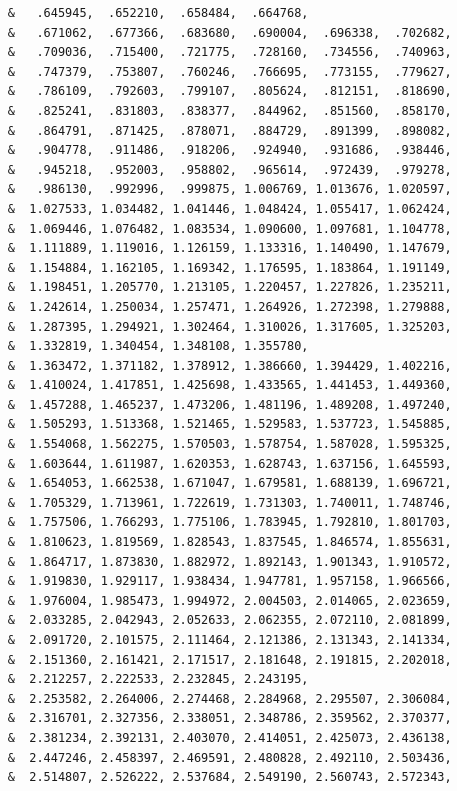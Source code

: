 \begin{lstlisting}
     &   .645945,  .652210,  .658484,  .664768,
     &   .671062,  .677366,  .683680,  .690004,  .696338,  .702682,
     &   .709036,  .715400,  .721775,  .728160,  .734556,  .740963,
     &   .747379,  .753807,  .760246,  .766695,  .773155,  .779627,
     &   .786109,  .792603,  .799107,  .805624,  .812151,  .818690,
     &   .825241,  .831803,  .838377,  .844962,  .851560,  .858170,
     &   .864791,  .871425,  .878071,  .884729,  .891399,  .898082,
     &   .904778,  .911486,  .918206,  .924940,  .931686,  .938446,
     &   .945218,  .952003,  .958802,  .965614,  .972439,  .979278,
     &   .986130,  .992996,  .999875, 1.006769, 1.013676, 1.020597,
     &  1.027533, 1.034482, 1.041446, 1.048424, 1.055417, 1.062424,
     &  1.069446, 1.076482, 1.083534, 1.090600, 1.097681, 1.104778,
     &  1.111889, 1.119016, 1.126159, 1.133316, 1.140490, 1.147679,
     &  1.154884, 1.162105, 1.169342, 1.176595, 1.183864, 1.191149,
     &  1.198451, 1.205770, 1.213105, 1.220457, 1.227826, 1.235211,
     &  1.242614, 1.250034, 1.257471, 1.264926, 1.272398, 1.279888,
     &  1.287395, 1.294921, 1.302464, 1.310026, 1.317605, 1.325203,
     &  1.332819, 1.340454, 1.348108, 1.355780,
     &  1.363472, 1.371182, 1.378912, 1.386660, 1.394429, 1.402216,
     &  1.410024, 1.417851, 1.425698, 1.433565, 1.441453, 1.449360,
     &  1.457288, 1.465237, 1.473206, 1.481196, 1.489208, 1.497240,
     &  1.505293, 1.513368, 1.521465, 1.529583, 1.537723, 1.545885,
     &  1.554068, 1.562275, 1.570503, 1.578754, 1.587028, 1.595325,
     &  1.603644, 1.611987, 1.620353, 1.628743, 1.637156, 1.645593,
     &  1.654053, 1.662538, 1.671047, 1.679581, 1.688139, 1.696721,
     &  1.705329, 1.713961, 1.722619, 1.731303, 1.740011, 1.748746,
     &  1.757506, 1.766293, 1.775106, 1.783945, 1.792810, 1.801703,
     &  1.810623, 1.819569, 1.828543, 1.837545, 1.846574, 1.855631,
     &  1.864717, 1.873830, 1.882972, 1.892143, 1.901343, 1.910572,
     &  1.919830, 1.929117, 1.938434, 1.947781, 1.957158, 1.966566,
     &  1.976004, 1.985473, 1.994972, 2.004503, 2.014065, 2.023659,
     &  2.033285, 2.042943, 2.052633, 2.062355, 2.072110, 2.081899,
     &  2.091720, 2.101575, 2.111464, 2.121386, 2.131343, 2.141334,
     &  2.151360, 2.161421, 2.171517, 2.181648, 2.191815, 2.202018,
     &  2.212257, 2.222533, 2.232845, 2.243195,
     &  2.253582, 2.264006, 2.274468, 2.284968, 2.295507, 2.306084,
     &  2.316701, 2.327356, 2.338051, 2.348786, 2.359562, 2.370377,
     &  2.381234, 2.392131, 2.403070, 2.414051, 2.425073, 2.436138,
     &  2.447246, 2.458397, 2.469591, 2.480828, 2.492110, 2.503436,
     &  2.514807, 2.526222, 2.537684, 2.549190, 2.560743, 2.572343,

\end{lstlisting}

